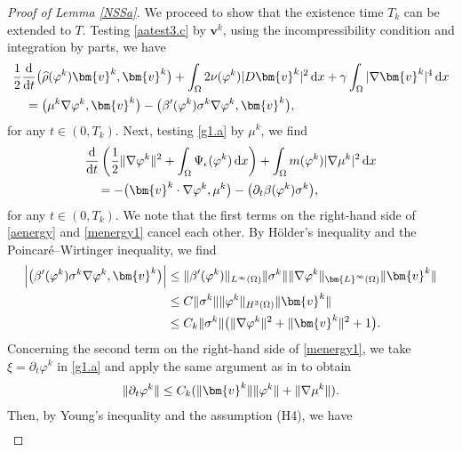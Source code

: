 \documentclass[11pt,reqno]{amsart}
\def\vv{\bm{v}}
\begin{document}
\begin{proof}[Proof of Lemma \ref{NSSa}]
We proceed to show that the existence time $T_k$ can be extended to $T$.
Testing \eqref{aatest3.c} by $\bm{v}^{k}$, using the incompressibility condition and integration by parts, we have
%
\begin{align}
&\frac12 \frac{\mathrm{d}}{\mathrm{d}t}\big(\widehat{\rho}(\varphi^k) \bm{v}^k, \bm{v}^k\big) +\int_{\Omega}2\nu(\varphi^{k} )|D\bm{v}^{k}|^2 \, \mathrm{d}x + \gamma \int_\Omega |\nabla \vv^k|^4 \, \mathrm{d}x
 \notag \\
 &\quad  = \big( \mu^{k}\nabla \varphi^{k},\bm{v}^{k}\big)
-\big(\beta'(\varphi^k)\sigma^{k}\nabla \varphi^{k},\bm{v}^{k}\big),
\label{aenergy}
\end{align}
%
for any $t\in(0,T_k)$. Next, testing \eqref{g1.a} by $\mu^{k}$, we find
%
\begin{align}
& \frac{\mathrm{d}}{\mathrm{d}t}
\left(\frac{1}{2}\|\nabla \varphi^{k}\|^2+ \int_\Omega  \Psi_\epsilon(\varphi^{k})\, \mathrm{d}x
  \right)
 + \int_\Omega m(\varphi^k)|\nabla \mu^{k}|^2\,\mathrm{d}x
\notag \\
&\quad  = -\big(\bm{v}^{k} \cdot \nabla \varphi^{k},\mu^{k}\big)
-\big( \partial_t\beta(\varphi^{k}) \sigma^{k}\big),
\label{menergy1}
\end{align}
%
for any $t\in(0,T_k)$.
 We note that the first terms on the right-hand side of \eqref{aenergy} and \eqref{menergy1} cancel each other.
%
By H\"{o}lder's inequality and the Poincar\'{e}--Wirtinger inequality, we find
\begin{align}
\left|\big(\beta'(\varphi^k) \sigma^{k} \nabla \varphi^{k},\bm{v}^{k}\big)\right|
&  \le  \| \beta'(\varphi^k) \|_{L^\infty(\Omega)} \| \sigma^{k}\|  \|\nabla\varphi^{k}\|_{\bm{L}^{\infty}(\Omega)}\|\bm{v}^{k}\|
\notag \\
&  \le  C  \| \sigma^{k}\|  \| \varphi^{k}\|_{H^3(\Omega)}  \|\bm{v}^{k}\|
\notag \\
& \le C_k\| \sigma^{k}\| \big( \|\nabla \varphi^{k}\|^2 +\|\bm{v}^{k}\|^2 +1 \big).
\label{me-a}
\end{align}
%
Concerning the second term on the right-hand side of \eqref{menergy1}, we take
$\xi=\partial_t\varphi^k$ in \eqref{g1.a} and apply the same argument as in \cite[Appendix 2]{GHW1} to obtain
%
\begin{align}
\|\partial_t\varphi^k\|
 \leq C_k(\|\bm{v}^{k}\| \|\varphi^{k}\| + \|\nabla \mu^{k}\|).
\notag
\end{align}
Then, by Young's inequality and the assumption (H4), we have
%
\begin{align}

\end{align}
\end{proof}
\end{document}
